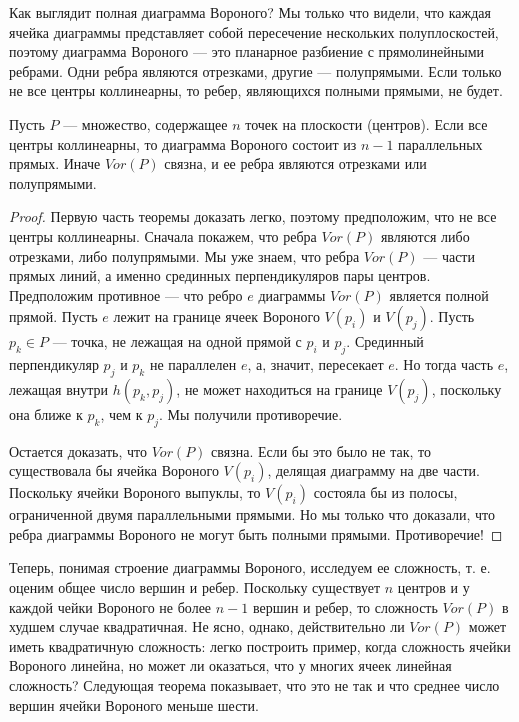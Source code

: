 Как  выглядит  полная  диаграмма  Вороного? 
Мы  только что  видели,  что  каждая  ячейка  диаграммы  представляет  собой  пересечение  нескольких  полуплоскостей,  поэтому  диаграмма  Вороного  ---  это планарное  разбиение  с  прямолинейными  ребрами.
Одни  ребра  являются  отрезками,  другие  ---  полупрямыми. 
Если  только  не  все  центры  коллинеарны,  то  ребер, являющихся  полными  прямыми,  не  будет.

\begin{theorem}
	Пусть $P$ --- множество, содержащее  $n$  точек  на  плоскости  (центров). 
	Если  все центры  коллинеарны,  то  диаграмма  Вороного  состоит  из $n - 1$  параллельных  прямых. 
	Иначе  $Vor(P)$ связна,  и  ее  ребра  являются  отрезками  или  полупрямыми.
\end{theorem}
\begin{proof}
	Первую  часть  теоремы  доказать  легко,  поэтому  предположим,  что  не  все  центры коллинеарны.
	Сначала  покажем,  что  ребра  $Vor(P)$  являются  либо  отрезками,  либо  полупрямыми. 
	Мы  уже  знаем,  что  ребра  $Vor(P)$  ---  части  прямых  линий,  а  именно  срединных перпендикуляров  пары  центров. 
	Предположим  противное  ---  что  ребро $e$ диаграммы $Vor(P)$ является  полной  прямой. 
	Пусть  $e$  лежит  на  границе ячеек  Вороного $V(p_i)$ и $V(p_j)$.
	Пусть $p_k \in P$  ---  точка,  не  лежащая на  одной  прямой  с  $p_i$ и $p_j$.
	Срединный  перпендикуляр  $p_j$  и  $p_k$  не параллелен  $e$,  а,  значит,  пересекает  $e$. 
	Но  тогда  часть  $e$,  лежащая внутри  $h(p_k,  p_j)$,  не  может  находиться  на  границе  $V(p_j)$,  поскольку  она  ближе  к  $p_k$,  чем  к  $p_j$.
	Мы  получили  противоречие.
	
	Остается  доказать,  что  $Vor(P)$  связна. 
	Если  бы  это  было  не так,  то  существовала  бы  ячейка  Вороного  $V(p_i)$,  делящая  диаграмму  на  две  части. 
	Поскольку  ячейки  Вороного  выпуклы,  то  $V(p_i)$  состояла  бы  из  полосы,  ограниченной  двумя  параллельными  прямыми.
	Но  мы  только  что  доказали,  что  ребра  диаграммы  Вороного  не  могут  быть  полными  прямыми. 
	Противоречие!
\end{proof}

Теперь,  понимая  строение  диаграммы  Вороного,  исследуем  ее  сложность,  т.  е.  оценим  общее  число  вершин  и  ребер. 
Поскольку  существует  $n$  центров  и  у  каждой чейки  Вороного  не  более  $n - 1$  вершин  и  ребер,  то  сложность $Vor(P)$  в  худшем случае  квадратичная. 
Не  ясно,  однако,  действительно  ли  $Vor(P)$  может  иметь  квадратичную  сложность:  легко  построить  пример,  когда  сложность  ячейки  Вороного линейна,  но  может  ли  оказаться,  что  у  многих  ячеек  линейная  сложность? 
Следующая  теорема  показывает,  что  это  не  так  и  что  среднее  число  вершин  ячейки Вороного  меньше  шести.

